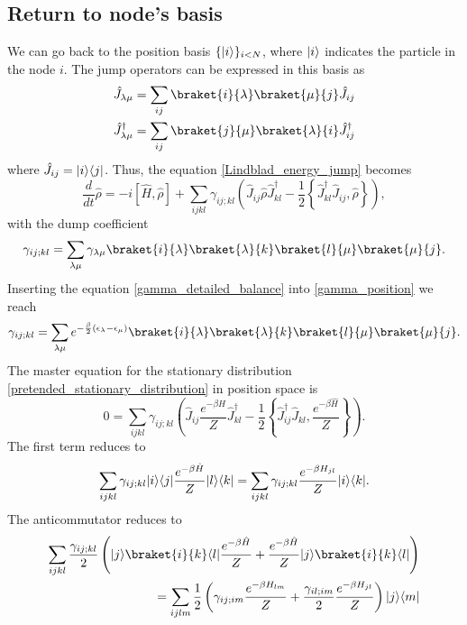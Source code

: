 \subsection{Return to node's basis}
We can go back to the position basis $\{\lvert i\rangle\}_{i<N}$, where $\lvert i\rangle$ indicates the particle in the node $i$.  
The jump operators can be expressed in this basis as
\begin{align}
    \hat J_{\lambda\mu} = \sum_{ij} \braket{i}{\lambda}\braket{\mu}{j}\hat J_{ij}\\
    \hat J_{\lambda\mu}^\dagger = \sum_{ij} \braket{j}{\mu}\braket{\lambda}{i}\hat J_{ij}^\dagger
\end{align}
where $\hat J_{ij} = \lvert i\rangle\langle j\rvert$.
Thus, the equation \eqref{Lindblad_energy_jump} becomes
\begin{equation}\label{quantum_network_position}
    \frac{d}{dt}\hat\rho = -i\left[\hat H,\hat\rho\right] +\sum_{ijkl} \gamma_{ij;kl} \left(\hat J_{ij}\hat\rho \hat J_{kl}^\dagger - \frac{1}{2}\left\{ \hat J_{kl}^\dagger\hat J_{ij}, \hat\rho\right\} \right),
\end{equation}
with the dump coefficient
\begin{equation}\label{gamma_position}
    \gamma_{ij;kl}= \sum_{\lambda\mu}\gamma_{\lambda\mu}\braket{i}{\lambda}\braket{\lambda}{k}\braket{l}{\mu}\braket{\mu}{j}.
\end{equation}
Inserting the equation \eqref{gamma_detailed_balance} into \eqref{gamma_position} we reach
\begin{equation}
    \gamma_{ij;kl}= \sum_{\lambda\mu}e^{-\frac{\beta}{2}\left(\epsilon_\lambda - \epsilon_\mu\right)}\braket{i}{\lambda}\braket{\lambda}{k}\braket{l}{\mu}\braket{\mu}{j}.
\end{equation}
The master equation for the stationary distribution \eqref{pretended_stationary_distribution} in position space is 
\begin{equation}
    0 = \sum_{ijkl} \gamma_{ij;kl} \left(\hat J_{ij}  \frac{e^{-\beta\hat H}}{Z} \hat J^\dagger_{kl} - \frac{1}{2}\left\{ \hat J^\dagger_{ij}\hat J_{kl},  \frac{e^{-\beta\hat H}}{Z}\right\} \right).
\end{equation}
The first term reduces to
\begin{equation}
    \sum_{ijkl}\gamma_{ij;kl} \lvert i\rangle\langle j\rvert \frac{e^{-\beta\hat H}}{Z} \lvert l\rangle\langle k\rvert = \sum_{ijkl}\gamma_{ij;kl} \frac{e^{-\beta H_{jl}}}{Z}\lvert i\rangle\langle k\rvert.
\end{equation}
The anticommutator reduces to
\begin{equation}
    \begin{split}
        \sum_{ijkl}  \frac{\gamma_{ij;kl}}{2}\left(\ket{j}\braket{i}{k}\bra{l} \frac{e^{-\beta\hat H}}{Z}+ \frac{e^{-\beta\hat H}}{Z}\ket{j}\braket{i}{k}\bra{l}\right) \\ 
        = \sum_{ijlm}\frac{1}{2} \left(\gamma_{ij;im}  \frac{e^{-\beta H_{lm}}}{Z} + \frac{\gamma_{il;im}}{2}\frac{e^{-\beta H_{jl}}}{Z}\right)\ket{j}\bra{m}
    \end{split}
\end{equation}
